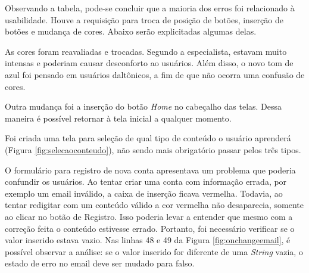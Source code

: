 Observando a tabela, pode-se concluir que a maioria dos erros foi relacionado à usabilidade. Houve a requisição para troca de posição de botões, inserção de botões e mudança de cores. Abaixo serão explicitadas algumas delas.

As cores foram reavaliadas e trocadas. Segundo a especialista, estavam muito intensas e poderiam causar desconforto ao usuários. Além disso, o novo tom de azul foi pensado em usuários daltônicos, a fim de que não ocorra uma confusão de cores.

    

Outra mudança foi a inserção do botão \textit{Home} no cabeçalho das telas. Dessa maneira é possível retornar à tela inicial a qualquer momento.

    

Foi criada uma tela para seleção de qual tipo de conteúdo o usuário aprenderá (Figura \ref{fig:selecaoconteudo}), não sendo mais obrigatório passar pelos três tipos.

    

O formulário para registro de nova conta apresentava um problema que poderia confundir os usuários. Ao tentar criar uma conta com informação errada, por exemplo um email inválido, a caixa de inserção ficava vermelha. Todavia, ao tentar redigitar com um conteúdo válido a cor vermelha não desaparecia, somente ao clicar no botão de Registro. Isso poderia levar a entender que mesmo com a correção feita o conteúdo estivesse errado. Portanto, foi necessário verificar se o valor inserido estava vazio. Nas linhas 48 e 49 da Figura \ref{fig:onchangeemail}, é possível observar a análise: se o valor inserido for diferente de uma \textit{String} vazia, o estado de erro no email deve ser mudado para falso.

